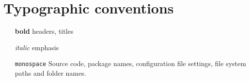 \section{Typographic conventions}

\begin{itemize}
    \item[\textbf{bold}] headers, titles
    \item[\textit{italic}] emphasis
    \item[\texttt{monospace}] Source code, package names, configuration file settings, file system paths and folder names.
\end{itemize}
